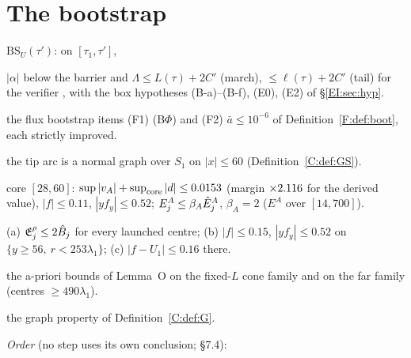 \documentclass[11pt]{article}
\begin{document}
\section{The bootstrap}\label{M:sec:boot}
\noindent$\mathrm{BS}_U(\tau')$: on $[\tau_1,\tau']$,
\begin{description}[leftmargin=1.2em]
\item[B1] $|\alpha|$ below the barrier and $\Lambda\le L(\tau)+2C'$ (march), $\le\ell(\tau)+2C'$ (tail) for the verifier , with the box hypotheses (B-a)--(B-f), (E0), (E2) of \S\ref{EI:sec:hyp}.
\item[BF] the flux bootstrap items (F1) (B$\Phi$) and (F2) $\bar a\le10^{-6}$ of Definition~\ref{F:def:boot}, each strictly improved.
\item[GS] the tip arc is a normal graph over $S_1$ on $|x|\le60$ (Definition~\ref{C:def:GS}).
\item[B2$'$] core $[28,60]$: $\sup|v_A|+\sup_{\rm core}|d|\le0.0153$ (margin $\times2.116$ for the derived value), $|f|\le0.11$, $|yf_y|\le0.52$; $E^A_j\le\beta_A\hat E^A_j$, $\beta_A=2$ ($E^A$ over $[14,700]$).
\item[B3U] (a) $\mathfrak E^\rho_j\le2\hat B_j$ for every launched centre; (b) $|f|\le0.15$, $|yf_y|\le0.52$ on $\{y\ge56,\ r<253\lambda_1\}$; (c) $|f-U_1|\le0.16$ there.
\item[B4] the a-priori bounds of Lemma~O on the fixed-$L$ cone family and on the far family (centres $\ge490\lambda_1$).
\item[G] the graph property of Definition~\ref{C:def:G}.
\end{description}
\noindent\emph{Order} (no step uses its own conclusion;  \S7.4):
\end{document}
